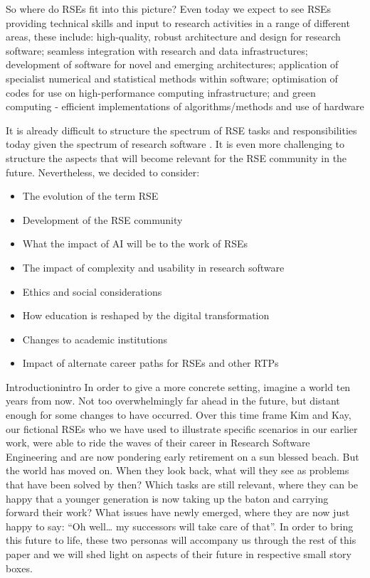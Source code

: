\documentclass{eceasst}
\begin{document}
So where do RSEs fit into this picture? Even today we expect to see RSEs providing technical skills and input
to research activities in a range of different areas, these include:
high-quality, robust architecture and design for research software;
seamless integration with research and data infrastructures;
development of software for novel and emerging architectures;
application of specialist numerical and statistical methods within software;
optimisation of codes for use on high-performance computing infrastructure;
and green computing - efficient implementations of algorithms/methods and use of hardware

It is already difficult to structure the spectrum of RSE tasks and responsibilities today given the spectrum of research software \cite{hasselbring2024}.
It is even more challenging to structure the aspects that will become relevant for the RSE community in the future.
Nevertheless, we decided to consider:
\begin{itemize}
\item The evolution of the term RSE
\item Development of the RSE community
\item What the impact of AI will be to the work of RSEs
\item The impact of complexity and usability in research software
\item Ethics and social considerations
\item How education is reshaped by the digital transformation
\item Changes to academic institutions
\item Impact of alternate career paths for RSEs and other RTPs
\end{itemize}

\begin{story}{Introduction}{intro}
In order to give a more concrete setting, imagine a world ten years from now.
Not too overwhelmingly far ahead in the future, but distant enough for some changes to have occurred.
Over this time frame Kim\cite{Anzt2021} and Kay\cite{Goth2024},
our fictional RSEs who we have used to illustrate specific scenarios in our earlier work,
were able to ride the waves of their career in Research Software Engineering and are now pondering early retirement on a sun blessed beach.
But the world has moved on.
When they look back, what will they see as problems that have been solved by then?
Which tasks are still relevant, where they can be happy that a younger generation is now taking up the baton and carrying forward their work?
What issues have newly emerged, where they are now just happy to say: “Oh well… my successors will take care of that”.
In order to bring this future to life, these two personas will accompany us through the rest of this paper and we will shed light on aspects
of their future in respective small story boxes.
 \end{story}
\end{document}
